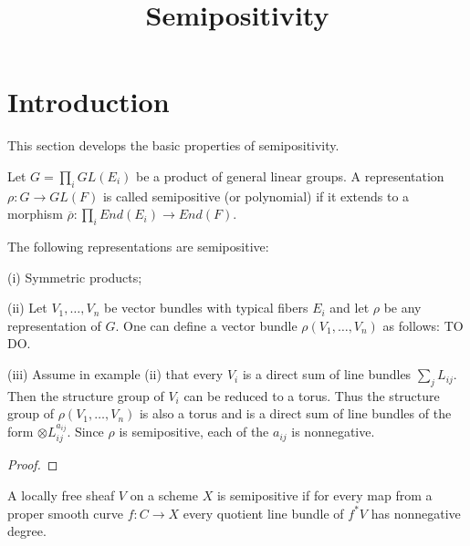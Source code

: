 


\newcommand{\todo}[1]{\footnote{\textbf{TODO.} #1}}


\title{Semipositivity}
\maketitle

\section{Introduction}
This section develops the basic properties of semipositivity.


\begin{definition}
Let $G=\prod_i GL(E_i)$ be a product of general linear groups. A representation $\rho:G\rightarrow GL(F)$ is called semipositive (or polynomial) if it extends to a morphism $\overline{\rho}:\prod_i End(E_i)\rightarrow End(F)$.
\end{definition}

\begin{lemma}
The following representations are semipositive:
\item[(i)] Symmetric products;
\item[(ii)] Let $V_1, \dots, V_n$ be vector bundles with typical fibers $E_i$ and let $\rho$ be any representation of $G$. One can define a vector bundle $\rho(V_1,\dots,V_n)$ as follows: TO DO.
\item[(iii)] Assume in example (ii) that every $V_i$ is a direct sum of line bundles $\sum_j L_{ij}$. Then the structure group of  $V_i$ can be reduced to a torus. Thus the structure group of $\rho(V_1,\dots, V_n)$ is also a torus and is a direct sum of line bundles of the form $\otimes L_{ij}^{a_{ij}}$. Since $\rho$ is semipositive, each of the $a_{ij}$ is nonnegative.
\end{lemma}


\begin{proof}

\end{proof}


\begin{definition}
A locally free sheaf $V$ on a scheme $X$ is semipositive if for every map from a proper smooth curve $f:C\to X$ every quotient line bundle of $f^*V$ has nonnegative degree.
\end{definition}

